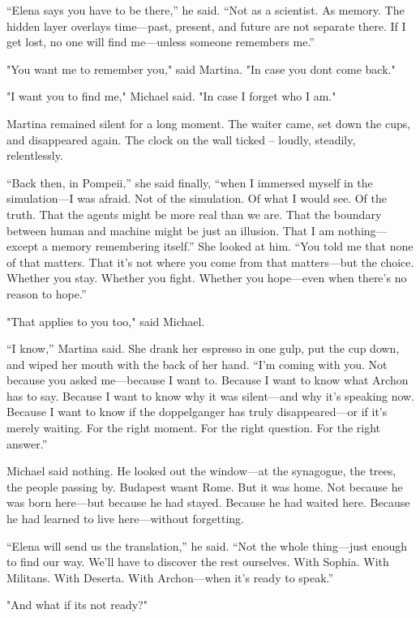 \documentclass[
]{article}
\begin{document}
``Elena says you have to be there,'' he said. ``Not as a scientist. As memory. The hidden layer overlays time---past, present, and future are not separate there. If I get lost, no one will find me---unless someone remembers me.''

"You want me to remember you," said Martina. "In case you don\textquotesingle t come back."

"I want you to find me," Michael said. "In case I forget who I am."

Martina remained silent for a long moment. The waiter came, set down the cups, and disappeared again. The clock on the wall ticked -- loudly, steadily, relentlessly.

``Back then, in Pompeii,'' she said finally, ``when I immersed myself in the simulation---I was afraid. Not of the simulation. Of what I would see. Of the truth. That the agents might be more real than we are. That the boundary between human and machine might be just an illusion. That I am nothing---except a memory remembering itself.'' She looked at him. ``You told me that none of that matters. That it's not where you come from that matters---but the choice. Whether you stay. Whether you fight. Whether you hope---even when there's no reason to hope.''

"That applies to you too," said Michael.

``I know,'' Martina said. She drank her espresso in one gulp, put the cup down, and wiped her mouth with the back of her hand. ``I'm coming with you. Not because you asked me---because I want to. Because I want to know what Archon has to say. Because I want to know why it was silent---and why it's speaking now. Because I want to know if the doppelganger has truly disappeared---or if it's merely waiting. For the right moment. For the right question. For the right answer.''

Michael said nothing. He looked out the window---at the synagogue, the trees, the people passing by. Budapest wasn\textquotesingle t Rome. But it was home. Not because he was born here---but because he had stayed. Because he had waited here. Because he had learned to live here---without forgetting.

``Elena will send us the translation,'' he said. ``Not the whole thing---just enough to find our way. We'll have to discover the rest ourselves. With Sophia. With Militans. With Deserta. With Archon---when it's ready to speak.''

"And what if it\textquotesingle s not ready?"
\end{document}
